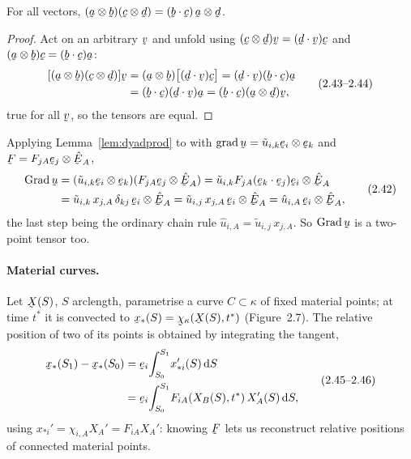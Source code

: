 \begin{lemma}\label{lem:dyadprod}
For all vectors, $(\ba\otimes\bb)(\bc\otimes\bd)=(\ip\bb\bc)\,\ba\otimes\bd$.
\end{lemma}

\begin{proof}
Act on an arbitrary $\bv$ and unfold using $(\bc\otimes\bd)\bv=(\ip\bd\bv)\bc$
and $(\ba\otimes\bb)\bc=(\ip\bb\bc)\ba$:
\begin{equation}
\begin{aligned}
   [(\ba\otimes\bb)(\bc\otimes\bd)]\bv&=(\ba\otimes\bb)\big[(\ip\bd\bv)\bc\big]
   =(\ip\bd\bv)(\ip\bb\bc)\ba\\
   &=(\ip\bb\bc)(\ip\bd\bv)\ba=(\ip\bb\bc)(\ba\otimes\bd)\bv,
\end{aligned}\tag{2.43--2.44}\label{eq:2.43}
\end{equation}
true for all $\bv$, so the tensors are equal.
\end{proof}

Applying Lemma~\ref{lem:dyadprod} to  with $\grad\bu=\tilde u_{i,k}
\be_i\otimes\be_k$ and $\bF=F_{jA}\be_j\otimes\hbE_A$,
\begin{equation}
\begin{aligned}
   \Grad\bu&=(\tilde u_{i,k}\be_i\otimes\be_k)(F_{jA}\be_j\otimes\hbE_A)
   =\tilde u_{i,k}F_{jA}(\ip{\be_k}{\be_j})\be_i\otimes\hbE_A\\
   &=\tilde u_{i,k}\,x_{j,A}\,\dd_{kj}\,\be_i\otimes\hbE_A
   =\tilde u_{i,j}\,x_{j,A}\,\be_i\otimes\hbE_A
   =\hat u_{i,A}\,\be_i\otimes\hbE_A,
\end{aligned}
\tag{2.42}\label{eq:2.42}
\end{equation}
the last step being the ordinary chain rule
$\hat u_{i,A}=\tilde u_{i,j}\,x_{j,A}$. So $\Grad\bu$ is a two-point tensor
too.

\paragraph*{Material curves.}
Let $\bX(S)$, $S$ arclength, parametrise a curve $C\subset\kappa$ of fixed
material points; at time $t^*$ it is convected to
$\bx_*(S)=\bchi_\kappa(\bX(S),t^*)$ (Figure~2.7). The relative position of
two of its points is obtained by integrating the tangent,
\begin{equation}
\begin{aligned}
   \bx_*(S_1)-\bx_*(S_0)&=\be_i\!\int_{S_0}^{S_1}\!x_{*i}'(S)\,\dl S\\
   &=\be_i\!\int_{S_0}^{S_1}\!F_{iA}(X_B(S),t^*)\,X_A'(S)\,\dl S,
\end{aligned}
\tag{2.45--2.46}\label{eq:2.45}
\end{equation}
using $x_{*i}'=\chi_{i,A}X_A'=F_{iA}X_A'$: knowing $\bF$ lets us reconstruct
relative positions of connected material points.

